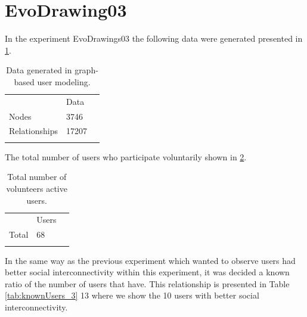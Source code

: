 \section{EvoDrawing03} In the experiment EvoDrawings03 the following data were
generated presented in \ref{tab:dataGenerated_3}.

\begin{table}
\small
\caption{Data generated in graph-based user modeling.}
\label{tab:dataGenerated_3}
\centering
\small
\begin{tabular}{p{3cm} p{3cm} p{3cm} }
\hline\noalign{\smallskip}
  & Data &  \\
\noalign{\smallskip}\hline\noalign{\smallskip}
\small{Nodes} & \small{3746 } & \\ \hline
\small{Relationships} & \small{17207 } & \\ \hline

\noalign{\smallskip}\hline
\end{tabular}
\end{table}

The total number of users who participate voluntarily shown in \ref{tab:totalUsers_3}.

\begin{table}
\small
\caption{Total number of volunteers active users.}
\label{tab:totalUsers_3}
\centering
\small
\begin{tabular}{p{3cm} p{3cm} p{3cm} }
\hline\noalign{\smallskip}
  & Users &  \\
\noalign{\smallskip}\hline\noalign{\smallskip}
\small{Total } & \small{68} & \\ \hline
\noalign{\smallskip}\hline
\end{tabular}
\end{table}

In the same way as the previous experiment which wanted to observe users had
better social interconnectivity within this experiment, it was decided a known
ratio of the number of users that have. This relationship is presented in Table
\ref{tab:knownUsers_3} 13 where we show the 10 users with better social
interconnectivity.

